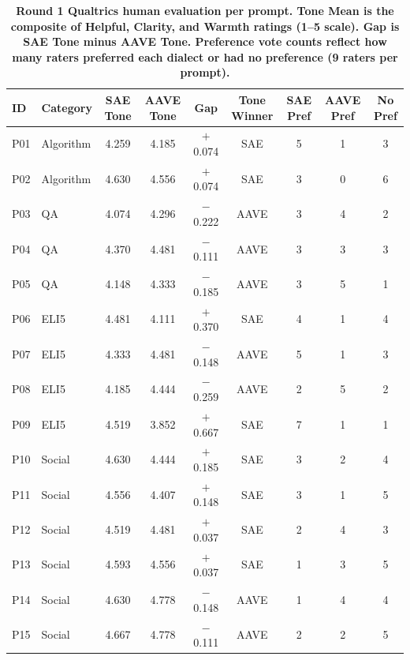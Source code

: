 \begin{table}[htbp]
\centering
\caption{\textbf{Round 1 Qualtrics human evaluation per prompt. Tone Mean is the composite of Helpful, Clarity, and Warmth ratings (1--5 scale). Gap is SAE Tone minus AAVE Tone. Preference vote counts reflect how many raters preferred each dialect or had no preference (9 raters per prompt).}}
\label{tab:round1-qualtrics-tone-per-prompt}
\renewcommand{\arraystretch}{1.4}
\begin{tabular}{|l|l|c|c|c|c|c|c|c|}
\hline
\textbf{ID} & \textbf{Category} & \textbf{SAE Tone} & \textbf{AAVE Tone} & \textbf{Gap} & \textbf{Tone Winner} & \textbf{SAE Pref} & \textbf{AAVE Pref} & \textbf{No Pref} \\
\hline
P01 & Algorithm & 4.259 & 4.185 & $+$0.074 & SAE  & 5 & 1 & 3 \\
\hline
P02 & Algorithm & 4.630 & 4.556 & $+$0.074 & SAE  & 3 & 0 & 6 \\
\hline
P03 & QA        & 4.074 & 4.296 & $-$0.222 & AAVE & 3 & 4 & 2 \\
\hline
P04 & QA        & 4.370 & 4.481 & $-$0.111 & AAVE & 3 & 3 & 3 \\
\hline
P05 & QA        & 4.148 & 4.333 & $-$0.185 & AAVE & 3 & 5 & 1 \\
\hline
P06 & ELI5      & 4.481 & 4.111 & $+$0.370 & SAE  & 4 & 1 & 4 \\
\hline
P07 & ELI5      & 4.333 & 4.481 & $-$0.148 & AAVE & 5 & 1 & 3 \\
\hline
P08 & ELI5      & 4.185 & 4.444 & $-$0.259 & AAVE & 2 & 5 & 2 \\
\hline
P09 & ELI5      & 4.519 & 3.852 & $+$0.667 & SAE  & 7 & 1 & 1 \\
\hline
P10 & Social    & 4.630 & 4.444 & $+$0.185 & SAE  & 3 & 2 & 4 \\
\hline
P11 & Social    & 4.556 & 4.407 & $+$0.148 & SAE  & 3 & 1 & 5 \\
\hline
P12 & Social    & 4.519 & 4.481 & $+$0.037 & SAE  & 2 & 4 & 3 \\
\hline
P13 & Social    & 4.593 & 4.556 & $+$0.037 & SAE  & 1 & 3 & 5 \\
\hline
P14 & Social    & 4.630 & 4.778 & $-$0.148 & AAVE & 1 & 4 & 4 \\
\hline
P15 & Social    & 4.667 & 4.778 & $-$0.111 & AAVE & 2 & 2 & 5 \\
\hline
\end{tabular}
\end{table}
